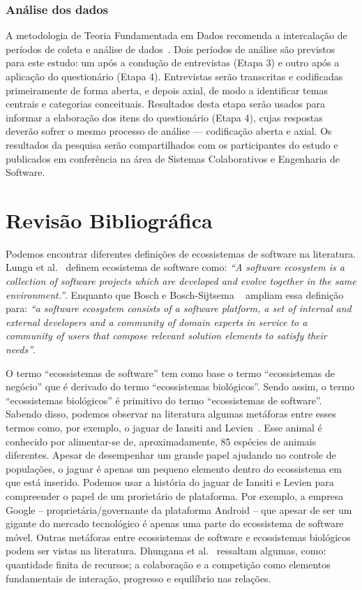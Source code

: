 \documentclass[conference]{IEEEtran}
\begin{document}
\subsubsection{Análise dos dados}

A metodologia de Teoria Fundamentada em Dados recomenda a intercalação de períodos de coleta e análise de dados~\cite{Corbin2008}. Dois períodos de análise são previstos para este estudo: um após a condução de entrevistas (Etapa 3) e outro após a aplicação do questionário (Etapa 4). Entrevistas serão transcritas e codificadas primeiramente de forma aberta, e depois axial, de modo a identificar temas centrais e categorias conceituais. Resultados desta etapa serão usados para informar a elaboração dos itens do questionário (Etapa 4), cujas respostas deverão sofrer o mesmo processo de análise --- codificação aberta e axial. Os resultados da pesquisa serão compartilhados com os participantes do estudo e publicados em conferência na área de Sistemas Colaborativos e Engenharia de Software.


\section{Revisão Bibliográfica}

Podemos encontrar diferentes definições de ecossistemas de software na literatura. Lungu et al.~\cite{Lungu2010264} definem ecosistema de software como: \emph{“A software ecosystem is a collection of software projects which are developed and evolve together in the same environment.”}. Enquanto que Bosch e Bosch-Sijtsema ~\cite{Bosch201067} ampliam essa definição para: \emph{“a software ecosystem consists of a software platform, a set of internal and external developers and a community of domain experts in service to a community of users that compose relevant solution elements to satisfy their needs”}.  

O termo “ecossistemas de software” tem como base o termo “ecossistemas de negócio” que é derivado do termo “ecossistemas biológicos”. Sendo assim, o termo “ecossistemas biológicos” é primitivo do termo “ecossistemas de software”. Sabendo disso, podemos observar na literatura algumas metáforas entre esses termos como, por exemplo, o jaguar de Iansiti and Levien~\cite{Iansiti2004}. Esse animal é conhecido por alimentar-se de, aproximadamente, 85 espécies de animais diferentes. Apesar de desempenhar um grande papel ajudando no controle de populações, o jaguar é apenas um pequeno elemento dentro do ecossistema em que está inserido. Podemos usar a história do jaguar de Iansiti e Levien para compreender o papel de um prorietário de plataforma. Por exemplo, a empresa Google -- proprietária/governante da plataforma Android -- que apesar de ser um gigante do mercado tecnológico é apenas uma parte do ecossistema de software móvel. Outras metáforas entre ecossistemas de software e ecossistemas biológicos podem ser vistas na literatura. Dhungana et al.~\cite{Dhungana2010} ressaltam algumas, como: quantidade finita de recursos; a colaboração e a competição como elementos fundamentais de interação, progresso e equilíbrio nas relações. 
\end{document}
